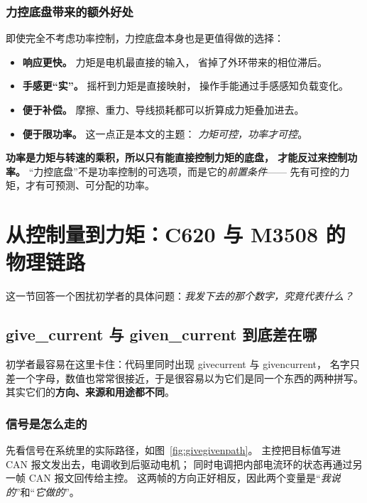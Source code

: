 \documentclass[cn,blue,11pt,device=normal]{elegantnote}
\newcommand{\code}[1]{{\ttfamily\small\def\_{\textunderscore\allowbreak}#1}}
\begin{document}
\subsubsection{力控底盘带来的额外好处}

即使完全不考虑功率控制，力控底盘本身也是更值得做的选择：

\begin{itemize}
  \item \textbf{响应更快。} 力矩是电机最直接的输入，
  省掉了外环带来的相位滞后。
  \item \textbf{手感更“实”。} 摇杆到力矩是直接映射，
  操作手能通过手感感知负载变化。
  \item \textbf{便于补偿。} 摩擦、重力、导线损耗都可以折算成力矩叠加进去。
  \item \textbf{便于限功率。} 这一点正是本文的主题：
  \emph{力矩可控，功率才可控}。
\end{itemize}

\begin{note}[一句话记住这一节]
\textbf{功率是力矩与转速的乘积，所以只有能直接控制力矩的底盘，
才能反过来控制功率。}
“力控底盘”不是功率控制的可选项，而是它的\emph{前置条件}——
先有可控的力矩，才有可预测、可分配的功率。
\end{note}

\section{从控制量到力矩：C620 与 M3508 的物理链路}\label{sec:cmd2torque}

这一节回答一个困扰初学者的具体问题：\emph{我发下去的那个数字，究竟代表什么？}

\subsection{give\_current 与 given\_current 到底差在哪}

初学者最容易在这里卡住：代码里同时出现 \code{give\_current} 与 \code{given\_current}，
名字只差一个字母，数值也常常很接近，于是很容易以为它们是同一个东西的两种拼写。
其实它们的\textbf{方向、来源和用途都不同}。

\subsubsection{信号是怎么走的}

先看信号在系统里的实际路径，如图~\ref{fig:givegivenpath}。
主控把目标值写进 CAN 报文发出去，电调收到后驱动电机；
同时电调把内部电流环的状态再通过另一帧 CAN 报文回传给主控。
这两帧的方向正好相反，因此两个变量是“\emph{我说的}”和“\emph{它做的}”。
\end{document}
